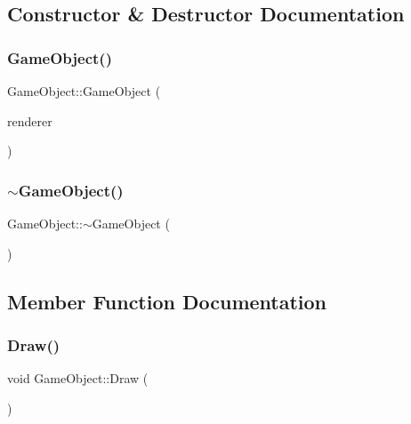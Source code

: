 \subsection{Constructor \& Destructor Documentation}
\mbox{\label{class_game_object_a0b60783781874241ad26049ad968a78b}} 
\subsubsection{\texorpdfstring{Game\+Object()}{GameObject()}}
{\footnotesize\ttfamily Game\+Object\+::\+Game\+Object (\begin{DoxyParamCaption}\item[{S\+D\+L\+\_\+\+Renderer $\ast$}]{renderer }\end{DoxyParamCaption})}

\mbox{\label{class_game_object_ab82dfdb656f9051c0587e6593b2dda97}} 
\subsubsection{\texorpdfstring{$\sim$\+Game\+Object()}{~GameObject()}}
{\footnotesize\ttfamily Game\+Object\+::$\sim$\+Game\+Object (\begin{DoxyParamCaption}{ }\end{DoxyParamCaption})}



\subsection{Member Function Documentation}
\mbox{\label{class_game_object_ad3ac1deac50048cf7a1a19eb0e61ad26}} 
\subsubsection{\texorpdfstring{Draw()}{Draw()}}
{\footnotesize\ttfamily void Game\+Object\+::\+Draw (\begin{DoxyParamCaption}{ }\end{DoxyParamCaption})\hspace{0.3cm}{\ttfamily [virtual]}}

